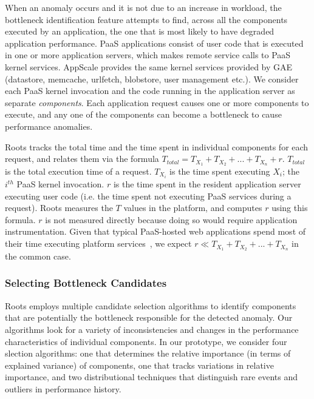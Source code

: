 When an anomaly occurs and it is not due to an increase in workload,
the bottleneck identification feature attempts to find, across all
the components executed by an application, the one that is most likely to have 
degraded application performance.
PaaS applications 
consist of user code that is executed in one or more application servers,
which makes remote service calls to PaaS kernel services. 
AppScale provides the same kernel services provided by GAE (datastore, memcache,
urlfetch, blobstore, user management etc.).
We consider each PaaS kernel invocation and the code running in the application server as 
separate \textit{components}. Each application request causes one or more components to
execute, and any one of the components can become a bottleneck to cause performance anomalies.  

Roots tracks the total time and the time spent in individual components for each request, 
and relates them via the formula $T_{total} = T_{X_1} + T_{X_2} + ... + T_{X_n} + r$. 
$T_{total}$ is the total execution time of a request. $T_{X_i}$ is the time spent executing
$X_i$; the $i^{th}$ PaaS kernel invocation.  $r$ is the time spent in the resident
application server executing user code (i.e. the time
spent not executing PaaS services during a request). Roots measures the $T$ values in the platform, and
computes $r$ using this formula. $r$ is not measured directly because doing so would require 
application instrumentation. Given that typical PaaS-hosted web
applications spend most of their time executing platform 
services~\cite{Jayathilaka:2015:RTS:2806777.2806842},
we expect $r \ll T_{X_1} + T_{X_2} + ... + T_{X_n}$ in the common case.

\subsubsection{Selecting Bottleneck Candidates}

Roots employs multiple candidate selection algorithms to identify 
components that are potentially
the bottleneck responsible for the detected anomaly. Our algorithms look for
a variety of inconsistencies and changes in the performance characteristics of 
individual components.  In our prototype, we consider four slection
algorithms:
one that determines the relative importance (in terms of explained variance)
of components, one that tracks 
variations in relative importance, and two 
distributional techniques that distinguish rare events and 
outliers in performance history.

